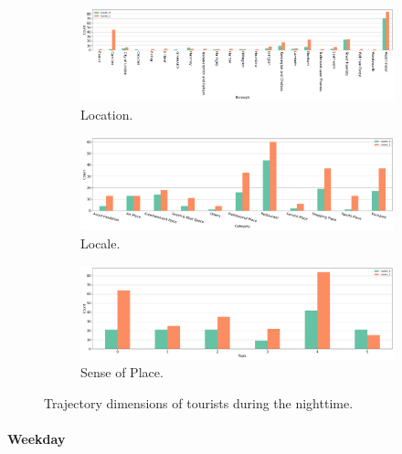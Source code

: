 \documentclass{article}
\newcommand{\subsubsubsection}[1]{\paragraph{#1}\mbox{}\\}
\theoremstyle{remark}
\begin{document}
\begin{figure}[!h]

\centering
\begin{subfigure}{0.6\textheight}
\centering
\includegraphics[width=1\linewidth]{figures/traj_location_nighttime_tourists.png}
\caption{Location.}
\label{fig:traj_location_nighttime_tourists}
\end{subfigure}
\begin{subfigure}{0.6\textheight}
\centering
\includegraphics[width=1\linewidth]{figures/traj_locale_nighttime_tourists.png}
\caption{Locale.}
\label{fig:traj_locale_nighttime_tourists}
\end{subfigure}
\begin{subfigure}{0.6\textheight}
\centering
\includegraphics[width=1\linewidth]{figures/traj_sense_nighttime_tourists.png}
\caption{Sense of Place.}
\label{fig:traj_sense_nighttime_tourists}
\end{subfigure}

\caption{Trajectory dimensions of tourists during the nighttime.}
\label{fig:traj_dimension_nighttime_tourists}
\end{figure}


\subsubsubsection{Weekday}
\end{document}
